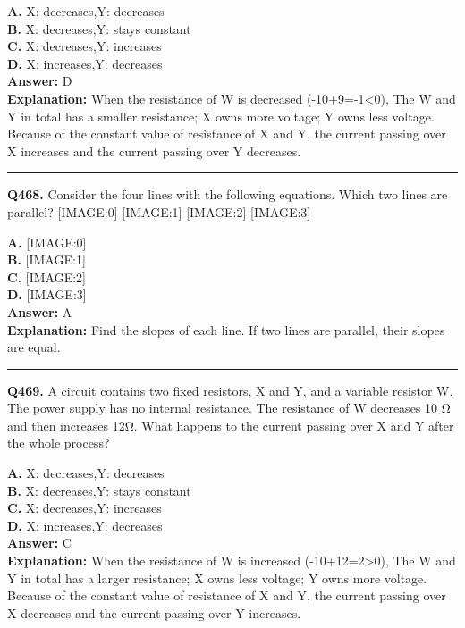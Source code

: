 \documentclass[12pt]{article}
\begin{document}
\textbf{A.} X: decreases,Y: decreases \\
\textbf{B.} X: decreases,Y: stays constant \\
\textbf{C.} X: decreases,Y: increases \\
\textbf{D.} X: increases,Y: decreases \\

\textbf{Answer:} D \\
\textbf{Explanation:} When the resistance of W is decreased (-10+9=-1<0), The W and Y in total has a smaller resistance; X owns more voltage; Y owns less voltage. Because of the constant value of resistance of X and Y, the current passing over X increases and the current passing over Y decreases.

\hrule
\vspace{1em}


\noindent
\textbf{Q468.} Consider the four lines with the following equations.
Which two lines are parallel?
[IMAGE:0]
[IMAGE:1]
[IMAGE:2]
[IMAGE:3]



\textbf{A.} [IMAGE:0] \\
\textbf{B.} [IMAGE:1] \\
\textbf{C.} [IMAGE:2] \\
\textbf{D.} [IMAGE:3] \\

\textbf{Answer:} A \\
\textbf{Explanation:} Find the slopes of each line. If two lines are parallel, their slopes are equal.

\hrule
\vspace{1em}


\noindent
\textbf{Q469.} A circuit contains two fixed resistors, X and Y, and a variable resistor W. The power supply has no internal resistance.
The resistance of W decreases 10 Ω and then increases 12Ω. What happens to the current passing over X and Y after the whole process?



\textbf{A.} X: decreases,Y: decreases \\
\textbf{B.} X: decreases,Y: stays constant \\
\textbf{C.} X: decreases,Y: increases \\
\textbf{D.} X: increases,Y: decreases \\

\textbf{Answer:} C \\
\textbf{Explanation:} When the resistance of W is increased (-10+12=2>0), The W and Y in total has a larger resistance; X owns less voltage; Y owns more voltage. Because of the constant value of resistance of X and Y, the current passing over X decreases and the current passing over Y increases.
\end{document}
